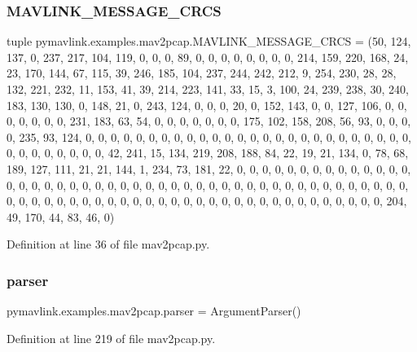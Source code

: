 \subsubsection{\texorpdfstring{MAVLINK\_MESSAGE\_CRCS}{MAVLINK\_MESSAGE\_CRCS}}
{\footnotesize\ttfamily tuple pymavlink.\+examples.\+mav2pcap.\+M\+A\+V\+L\+I\+N\+K\+\_\+\+M\+E\+S\+S\+A\+G\+E\+\_\+\+C\+R\+CS = (50, 124, 137, 0, 237, 217, 104, 119, 0, 0, 0, 89, 0, 0, 0, 0, 0, 0, 0, 0, 214, 159, 220, 168, 24, 23, 170, 144, 67, 115, 39, 246, 185, 104, 237, 244, 242, 212, 9, 254, 230, 28, 28, 132, 221, 232, 11, 153, 41, 39, 214, 223, 141, 33, 15, 3, 100, 24, 239, 238, 30, 240, 183, 130, 130, 0, 148, 21, 0, 243, 124, 0, 0, 0, 20, 0, 152, 143, 0, 0, 127, 106, 0, 0, 0, 0, 0, 0, 0, 231, 183, 63, 54, 0, 0, 0, 0, 0, 0, 0, 175, 102, 158, 208, 56, 93, 0, 0, 0, 0, 235, 93, 124, 0, 0, 0, 0, 0, 0, 0, 0, 0, 0, 0, 0, 0, 0, 0, 0, 0, 0, 0, 0, 0, 0, 0, 0, 0, 0, 0, 0, 0, 0, 0, 0, 0, 0, 42, 241, 15, 134, 219, 208, 188, 84, 22, 19, 21, 134, 0, 78, 68, 189, 127, 111, 21, 21, 144, 1, 234, 73, 181, 22, 0, 0, 0, 0, 0, 0, 0, 0, 0, 0, 0, 0, 0, 0, 0, 0, 0, 0, 0, 0, 0, 0, 0, 0, 0, 0, 0, 0, 0, 0, 0, 0, 0, 0, 0, 0, 0, 0, 0, 0, 0, 0, 0, 0, 0, 0, 0, 0, 0, 0, 0, 0, 0, 0, 0, 0, 0, 0, 0, 0, 0, 0, 0, 0, 0, 0, 0, 0, 0, 0, 0, 0, 0, 0, 0, 0, 204, 49, 170, 44, 83, 46, 0)}



Definition at line 36 of file mav2pcap.\+py.

\mbox{\label{namespacepymavlink_1_1examples_1_1mav2pcap_a8de36bcbd07923f42fa0e68e76ac2d59}} 
\subsubsection{\texorpdfstring{parser}{parser}}
{\footnotesize\ttfamily pymavlink.\+examples.\+mav2pcap.\+parser = Argument\+Parser()}



Definition at line 219 of file mav2pcap.\+py.

\mbox{\label{namespacepymavlink_1_1examples_1_1mav2pcap_a78f8cdb50a3b8c40542c9fe3cbd57327}} 
